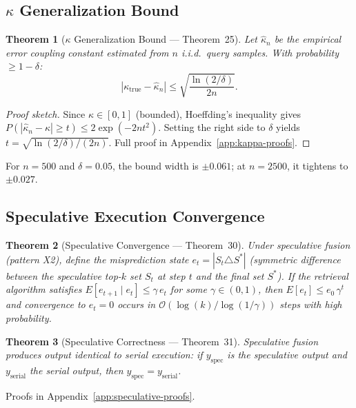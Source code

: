 \documentclass{article}
\newtheorem{theorem}{Theorem}
\theoremstyle{definition}
\theoremstyle{remark}
\newcommand{\BigO}{\mathcal{O}}
\begin{document}
\subsection{$\kappa$ Generalization Bound}

\begin{theorem}[$\kappa$ Generalization Bound --- Theorem~25]\label{thm:kappa-bound}
Let $\hat{\kappa}_n$ be the empirical error coupling constant estimated from $n$ i.i.d.\ query samples. With probability $\geq 1 - \delta$:
\[
  |\kappa_{\mathrm{true}} - \hat{\kappa}_n| \leq \sqrt{\frac{\ln(2/\delta)}{2n}}.
\]
\end{theorem}

\begin{proof}[Proof sketch]
Since $\kappa \in [0, 1]$ (bounded), Hoeffding's inequality gives $P(|\hat{\kappa}_n - \kappa| \geq t) \leq 2\exp(-2nt^2)$. Setting the right side to $\delta$ yields $t = \sqrt{\ln(2/\delta)/(2n)}$. Full proof in Appendix~\ref{app:kappa-proofs}.
\end{proof}

For $n = 500$ and $\delta = 0.05$, the bound width is $\pm 0.061$; at $n = 2500$, it tightens to $\pm 0.027$.

\subsection{Speculative Execution Convergence}

\begin{theorem}[Speculative Convergence --- Theorem~30]\label{thm:spec-converge}
Under speculative fusion (pattern X2), define the misprediction state $e_t = |S_t \triangle S^*|$ (symmetric difference between the speculative top-$k$ set $S_t$ at step $t$ and the final set $S^*$).
If the retrieval algorithm satisfies $E[e_{t+1} \mid e_t] \leq \gamma \, e_t$ for some $\gamma \in (0,1)$, then $E[e_t] \leq e_0 \, \gamma^t$ and convergence to $e_t = 0$ occurs in $\BigO(\log(k)/\log(1/\gamma))$ steps with high probability.
\end{theorem}

\begin{theorem}[Speculative Correctness --- Theorem~31]\label{thm:spec-correct}
Speculative fusion produces output identical to serial execution: if $y_{\mathrm{spec}}$ is the speculative output and $y_{\mathrm{serial}}$ the serial output, then $y_{\mathrm{spec}} = y_{\mathrm{serial}}$.
\end{theorem}

Proofs in Appendix~\ref{app:speculative-proofs}.
\end{document}
